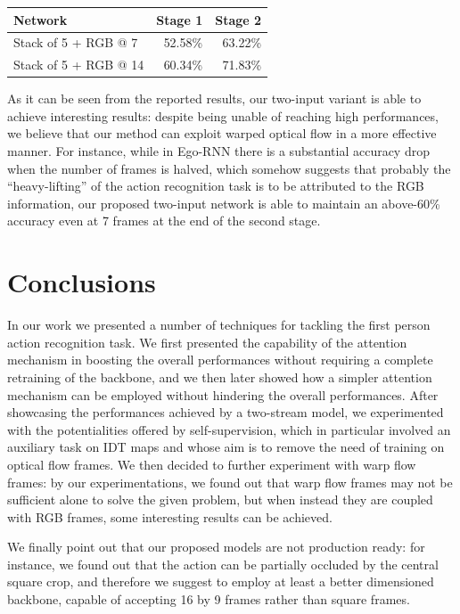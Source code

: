 \documentclass[10pt,twocolumn,letterpaper]{article}
\begin{document}
\vspace{12pt} \noindent
\begin{tabular}{l|rr}
	Network & Stage 1 & Stage 2 \\
	\hline
	Stack of 5 + RGB @ 7 & 52.58\% & 63.22\% \\
    Stack of 5 + RGB @ 14 & 60.34\% & 71.83\% \\
\end{tabular} \vspace{6pt}

As it can be seen from the reported results, our two-input variant is able to achieve interesting results: despite being unable of reaching high performances, we believe that our method can exploit warped optical flow in a more effective manner. For instance, while in Ego-RNN there is a substantial accuracy drop when the number of frames is halved, which somehow suggests that probably the ``heavy-lifting'' of the action recognition task is to be attributed to the RGB information, our proposed two-input network is able to maintain an above-60\% accuracy even at 7 frames at the end of the second stage.

\section{Conclusions}

In our work we presented a number of techniques for tackling the first person action recognition task. We first presented the capability of the attention mechanism in boosting the overall performances without requiring a complete retraining of the backbone, and we then later showed how a simpler attention mechanism can be employed without hindering the overall performances. After showcasing the performances achieved by a two-stream model, we experimented with the potentialities offered by self-supervision, which in particular involved an auxiliary task on IDT maps and whose aim is to remove the need of training on optical flow frames. We then decided to further experiment with warp flow frames: by our experimentations, we found out that warp flow frames may not be sufficient alone to solve the given problem, but when instead they are coupled with RGB frames, some interesting results can be achieved.

We finally point out that our proposed models are not production ready: for instance, we found out that the action can be partially occluded by the central square crop, and therefore we suggest to employ at least a better dimensioned backbone, capable of accepting 16 by 9 frames rather than square frames.

{\small


}
\end{document}
